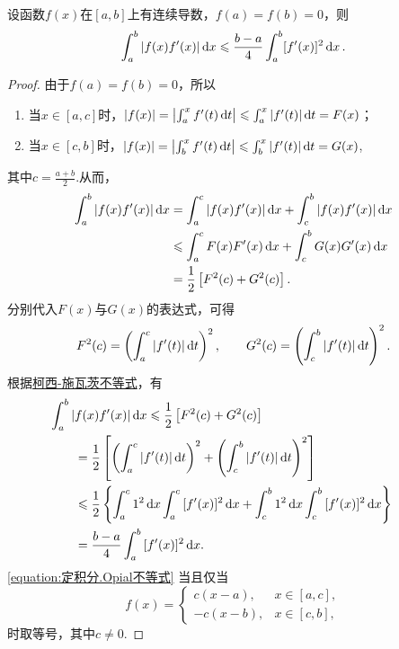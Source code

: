 \begin{theorem}[欧庇尔不等式]\label{theorem:定积分.欧庇尔不等式}
设函数\(f(x)\)在\([a,b]\)上有连续导数，\(f(a)=f(b)=0\)，则\begin{equation}\label{equation:定积分.Opial不等式}
\int_a^b \abs{f(x) f'(x)} \dd{x}
\leqslant \frac{b-a}{4}
\int_a^b [f'(x)]^2 \dd{x}.
\end{equation}
\begin{proof}
由于\(f(a)=f(b)=0\)，所以\begin{enumerate}
\item 当\(x \in \left[a,c\right]\)时，\(\abs{f(x)} = \abs{\int_a^x f'(t) \dd{t}} \leqslant \int_a^x \abs{f'(t)} \dd{t} = F(x)\)；
\item 当\(x \in \left[c,b\right]\)时，\(\abs{f(x)} = \abs{\int_b^x f'(t) \dd{t}} \leqslant \int_b^x \abs{f'(t)} \dd{t} = G(x)\),
\end{enumerate}其中\(c=\frac{a+b}{2}\).从而，\begin{align*}
\int_a^b \abs{f(x) f'(x)} \dd{x}
&= \int_a^c \abs{f(x) f'(x)} \dd{x}
    + \int_c^b \abs{f(x) f'(x)} \dd{x} \\
&\leqslant \int_a^c F(x) F'(x) \dd{x}
    + \int_c^b G(x) G'(x) \dd{x} \\
&= \frac{1}{2} \left[ F^2(c) + G^2(c) \right].
\end{align*}分别代入\(F(x)\)与\(G(x)\)的表达式，可得\[
F^2(c) = \left( \int_a^c \abs{f'(t)} \dd{t} \right)^2,
\qquad
G^2(c) = \left( \int_c^b \abs{f'(t)} \dd{t} \right)^2.
\]根据\hyperref[equation:定积分.柯西-施瓦茨不等式]{柯西-施瓦茨不等式}，有\begin{align*}
&\hspace{-20pt}\int_a^b{\abs{f(x) f'(x)} \dd{x}}
\leqslant \frac{1}{2} \left[
    F^2(c)
    + G^2(c)
    \right] \\
&= \frac{1}{2} \left[
    \left(\int_a^c{\abs{f'(t)}\dd{t}}\right)^2
    +\left(\int_c^b{\abs{f'(t)}\dd{t}}\right)^2
    \right] \\
&\leqslant \frac{1}{2} \left\{
    \int_a^c{1^2 \dd{x}}
    \int_a^c{[f'(x)]^2 \dd{x}}
    +\int_c^b{1^2 \dd{x}}
    \int_c^b{[f'(x)]^2 \dd{x}}
    \right\} \\
&= \frac{b-a}{4} \int_a^b{[f'(x)]^2 \dd{x}}.
\end{align*}
\cref{equation:定积分.Opial不等式} 当且仅当\[
f(x) = \left\{ \begin{array}{cl}
c(x-a), & x\in\left[a,c\right], \\
-c(x-b), & x\in\left[c,b\right],
\end{array} \right.
\]时取等号，其中\(c\neq0\).
\end{proof}
\end{theorem}

